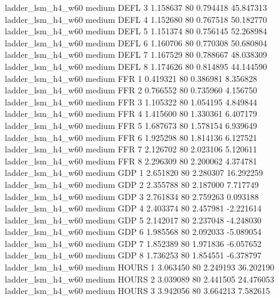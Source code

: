   ladder_lsm_h4_w60     medium     DEFL                 3  1.158637 80       0.794418          45.847313
  ladder_lsm_h4_w60     medium     DEFL                 4  1.152680 80       0.767518          50.182770
  ladder_lsm_h4_w60     medium     DEFL                 5  1.151374 80       0.756145          52.268984
  ladder_lsm_h4_w60     medium     DEFL                 6  1.160706 80       0.770308          50.680804
  ladder_lsm_h4_w60     medium     DEFL                 7  1.167529 80       0.788667          48.038309
  ladder_lsm_h4_w60     medium     DEFL                 8  1.174626 80       0.814895          44.144590
  ladder_lsm_h4_w60     medium      FFR                 1  0.419321 80       0.386981           8.356828
  ladder_lsm_h4_w60     medium      FFR                 2  0.766552 80       0.735960           4.156750
  ladder_lsm_h4_w60     medium      FFR                 3  1.105322 80       1.054195           4.849844
  ladder_lsm_h4_w60     medium      FFR                 4  1.415600 80       1.330361           6.407179
  ladder_lsm_h4_w60     medium      FFR                 5  1.687673 80       1.578154           6.939649
  ladder_lsm_h4_w60     medium      FFR                 6  1.925298 80       1.814136           6.127521
  ladder_lsm_h4_w60     medium      FFR                 7  2.126702 80       2.023106           5.120611
  ladder_lsm_h4_w60     medium      FFR                 8  2.296309 80       2.200062           4.374781
  ladder_lsm_h4_w60     medium      GDP                 1  2.651820 80       2.280307          16.292259
  ladder_lsm_h4_w60     medium      GDP                 2  2.355788 80       2.187000           7.717749
  ladder_lsm_h4_w60     medium      GDP                 3  2.761834 80       2.759263           0.093188
  ladder_lsm_h4_w60     medium      GDP                 4  2.403374 80       2.457981          -2.221614
  ladder_lsm_h4_w60     medium      GDP                 5  2.142017 80       2.237048          -4.248030
  ladder_lsm_h4_w60     medium      GDP                 6  1.985568 80       2.092033          -5.089054
  ladder_lsm_h4_w60     medium      GDP                 7  1.852389 80       1.971836          -6.057652
  ladder_lsm_h4_w60     medium      GDP                 8  1.736253 80       1.854551          -6.378797
  ladder_lsm_h4_w60     medium    HOURS                 1  3.063450 80       2.249193          36.202190
  ladder_lsm_h4_w60     medium    HOURS                 2  3.039089 80       2.441505          24.476053
  ladder_lsm_h4_w60     medium    HOURS                 3  3.942056 80       3.664213           7.582615
